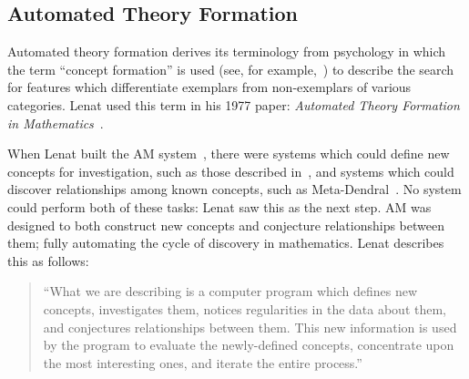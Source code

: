 \subsection{Automated Theory Formation}
\label{section:atf}


Automated theory formation derives its terminology from psychology in which the
term ``concept formation'' is used (see, for example,~\cite{bruner:67}) to
describe the search for features which differentiate exemplars from
non-exemplars of various categories. Lenat used this term in his 1977 paper:
{\em Automated Theory Formation in Mathematics}~\cite{lenat:77}.

When Lenat built the AM system~\cite{lenat:77}, there were systems
which could define new concepts for investigation, such as those
described in~\cite{winston}, and systems which could discover
relationships among known concepts, such as Meta-Dendral~\cite{buchanan:75}. No
system could perform both of these tasks: Lenat saw this as the next step. AM
was designed to both construct new concepts and conjecture relationships between
them; fully automating the cycle of discovery in mathematics. Lenat describes
this as follows:

\begin{quote}
``What we are describing is a computer program which
defines new concepts, investigates them, notices
regularities in the data about them, and conjectures
relationships between them. This new information is used
by the program to evaluate the newly-defined concepts,
concentrate upon the most interesting ones, and iterate the
entire process.''~\cite[p. 834]{lenat:77}
\end{quote}

